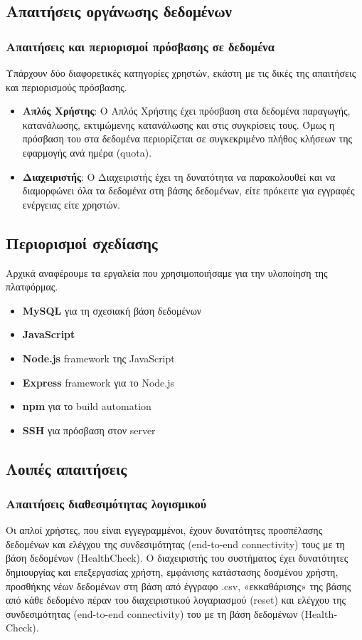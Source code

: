 \documentclass[a4paper,12pt, oneside]{article}
\begin{document}
\subsection{Απαιτήσεις οργάνωσης δεδομένων}
\subsubsection{Απαιτήσεις και περιορισμοί πρόσβασης σε δεδομένα}
Υπάρχουν δύο διαφορετικές κατηγορίες χρηστών, εκάστη με τις δικές της απαιτήσεις και περιορισμούς πρόσβασης.
\begin{itemize}
    \item \textbf{Απλός Χρήστης}: Ο Απλός Χρήστης έχει πρόσβαση στα δεδομένα παραγωγής, κατανάλωσης, εκτιμώμενης κατανάλωσης και στις συγκρίσεις τους.  Όμως η πρόσβαση του στα δεδομένα περιορίζεται σε συγκεκριμένο πλήθος κλήσεων της εφαρμογής ανά ημέρα \textlatin{(quota)}.  
    \item \textbf{Διαχειριστής}: Ο Διαχειριστής έχει τη δυνατότητα να παρακολουθεί και να διαμορφώνει όλα τα δεδομένα στη βάσης δεδομένων, είτε πρόκειτε για εγγραφές ενέργειας είτε χρηστών. 
\end{itemize}


\newpage
\subsection{Περιορισμοί σχεδίασης}
Αρχικά αναφέρουμε τα  εργαλεία που χρησιμοποιήσαμε για την υλοποίηση της πλατφόρμας.
\begin{itemize}
    \item \textbf{\textlatin{MySQL}} για τη σχεσιακή βάση δεδομένων
    \item \textbf{\textlatin{JavaScript}}
    \item \textbf{\textlatin{Node.js}} \textlatin{framework} της \textlatin{JavaScript}
    \item \textbf{\textlatin{Express}} \textlatin{framework} για το \textlatin{Node.js}
    \item \textbf{\textlatin{npm}} για το \textlatin{build automation} 
    \item \textbf{\textlatin{SSH}} για πρόσβαση στον server
\end{itemize}


\subsection{Λοιπές απαιτήσεις}
\subsubsection{Απαιτήσεις διαθεσιμότητας λογισμικού}
Οι απλοί χρήστες, που είναι εγγεγραμμένοι, έχουν δυνατότητες προσπέλασης δεδομένων και ελέγχου της  συνδεσιμότητας \textlatin{(end-to-end connectivity)} τους με τη βάση δεδομένων \textlatin{(HealthCheck)}. Ο διαχειριστής του συστήματος έχει δυνατότητες δημιουργίας και επεξεργασίας χρήστη, εμφάνισης κατάστασης δοσμένου χρήστη, προσθήκης νέων δεδομένων στη βάση από έγγραφο \textlatin{.csv}, «εκκαθάρισης» της βάσης από κάθε δεδομένο πέραν του διαχειριστικού λογαριασμού \textlatin{(reset)} και ελέγχου της  συνδεσιμότητας \textlatin{(end-to-end connectivity)} του με τη βάση δεδομένων \textlatin{(HealthCheck)}.   
\end{document}
